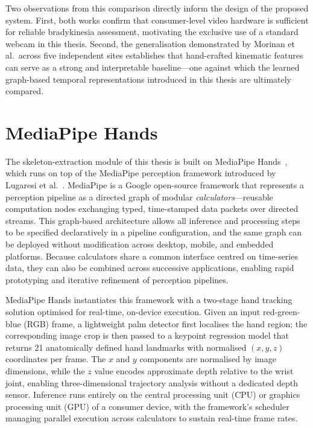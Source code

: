 Two observations from this comparison directly inform the design of the proposed system. First, both works confirm that consumer-level video hardware is sufficient for reliable bradykinesia assessment, motivating the exclusive use of a standard webcam in this thesis. Second, the generalisation demonstrated by Morinan et al.\ across five independent sites establishes that hand-crafted kinematic features can serve as a strong and interpretable baseline---one against which the learned graph-based temporal representations introduced in this thesis are ultimately compared.

\section{MediaPipe Hands}
\label{sec:rw_mediapipe}

The skeleton-extraction module of this thesis is built on MediaPipe Hands~\cite{zhang2020mediapipe}, which runs on top of the MediaPipe perception framework introduced by Lugaresi et al.~\cite{lugaresi2019mediapipe}. MediaPipe is a Google open-source framework that represents a perception pipeline as a directed graph of modular \emph{calculators}---reusable computation nodes exchanging typed, time-stamped data packets over directed streams. This graph-based architecture allows all inference and processing steps to be specified declaratively in a pipeline configuration, and the same graph can be deployed without modification across desktop, mobile, and embedded platforms. Because calculators share a common interface centred on time-series data, they can also be combined across successive applications, enabling rapid prototyping and iterative refinement of perception pipelines.

MediaPipe Hands instantiates this framework with a two-stage hand tracking solution optimised for real-time, on-device execution. Given an input red-green-blue (RGB) frame, a lightweight palm detector first localises the hand region; the corresponding image crop is then passed to a keypoint regression model that returns 21 anatomically defined hand landmarks with normalised $(x,y,z)$ coordinates per frame. The $x$ and $y$ components are normalised by image dimensions, while the $z$ value encodes approximate depth relative to the wrist joint, enabling three-dimensional trajectory analysis without a dedicated depth sensor. Inference runs entirely on the central processing unit (CPU) or graphics processing unit (GPU) of a consumer device, with the framework's scheduler managing parallel execution across calculators to sustain real-time frame rates.

